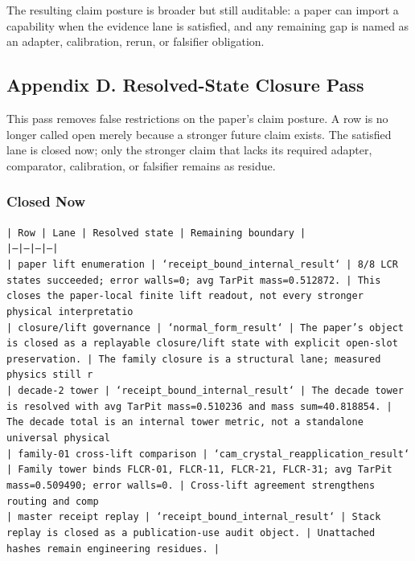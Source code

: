 \documentclass[11pt]{article}
\begin{document}
The resulting claim posture is broader but still auditable: a paper can import a capability when the evidence lane is satisfied, and any remaining gap is named as an adapter, calibration, rerun, or falsifier obligation.

\subsection*{Appendix D. Resolved-State Closure Pass}

This pass removes false restrictions on the paper's claim posture. A row is no longer called open merely because a stronger future claim exists. The satisfied lane is closed now; only the stronger claim that lacks its required adapter, comparator, calibration, or falsifier remains as residue.

\subsubsection*{Closed Now}

\noindent\texttt{| Row | Lane | Resolved state | Remaining boundary |}\\
\noindent\texttt{|---|---|---|---|}\\
\noindent\texttt{| paper lift enumeration | `receipt\_bound\_internal\_result` | 8/8 LCR states succeeded; error walls=0; avg TarPit mass=0.512872. | This closes the paper-local finite lift readout, not every stronger physical interpretatio}\\
\noindent\texttt{| closure/lift governance | `normal\_form\_result` | The paper's object is closed as a replayable closure/lift state with explicit open-slot preservation. | The family closure is a structural lane; measured physics still r}\\
\noindent\texttt{| decade-2 tower | `receipt\_bound\_internal\_result` | The decade tower is resolved with avg TarPit mass=0.510236 and mass sum=40.818854. | The decade total is an internal tower metric, not a standalone universal physical }\\
\noindent\texttt{| family-01 cross-lift comparison | `cam\_crystal\_reapplication\_result` | Family tower binds FLCR-01, FLCR-11, FLCR-21, FLCR-31; avg TarPit mass=0.509490; error walls=0. | Cross-lift agreement strengthens routing and comp}\\
\noindent\texttt{| master receipt replay | `receipt\_bound\_internal\_result` | Stack replay is closed as a publication-use audit object. | Unattached hashes remain engineering residues. |}\\
\end{document}
